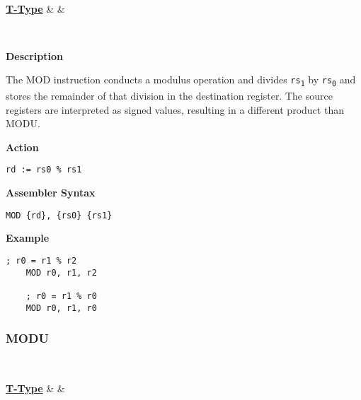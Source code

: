 \begin{center}
	\begin{bytefield}[leftcurly=., leftcurlyspace=0pt]{32}
		 \\
		\begin{leftwordgroup}{\hyperref[sec:t-type]{\textbf{T-Type}}}
		 & 
		 &
		\end{leftwordgroup}\\
	\end{bytefield}
\end{center}

\textbf{Description}

The MOD instruction conducts a modulus operation and divides \texttt{rs\textsubscript{1}} by \texttt{rs\textsubscript{0}} and stores the remainder of that division in the destination register.
The source registers are interpreted as signed values, resulting in a different product than MODU.

\vspace{3ex}

\textbf{Action}
\begin{lstlisting}[frame=single]
	rd := rs0 % rs1
\end{lstlisting}

\vspace{3ex}

\textbf{Assembler Syntax}
\begin{lstlisting}[frame=single]
	MOD {rd}, {rs0} {rs1}
\end{lstlisting}

\vspace{3ex}

\textbf{Example}
\begin{lstlisting}[frame=single]
	; r0 = r1 % r2
	MOD r0, r1, r2
	
	; r0 = r1 % r0
	MOD r0, r1, r0
\end{lstlisting}

\subsubsection{MODU }\label{sec:MODU}

\vspace{3ex}

\begin{center}
	\begin{bytefield}[leftcurly=., leftcurlyspace=0pt]{32}
		 \\
		\begin{leftwordgroup}{\hyperref[sec:t-type]{\textbf{T-Type}}}
		 & 
		 &
		\end{leftwordgroup}\\
	\end{bytefield}
\end{center}

